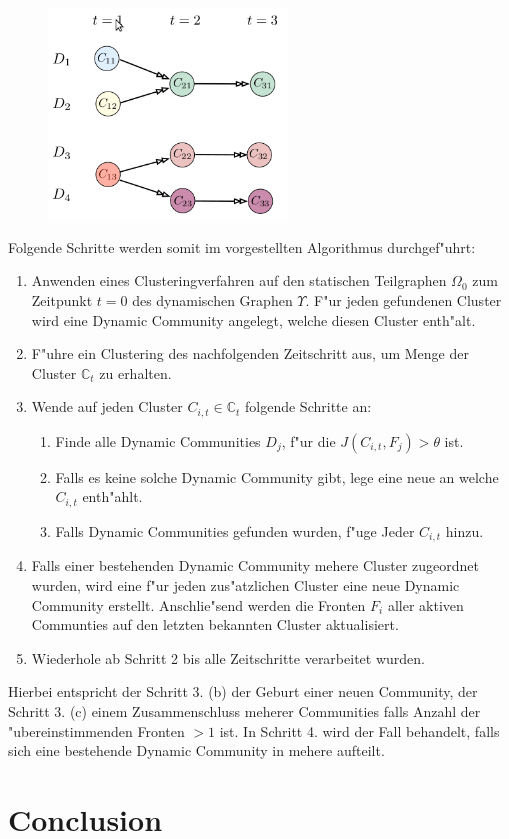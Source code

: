 \documentclass[journal]{vgtc}
\begin{document}
    \begin{figure}[b]
      \centering
      \includegraphics[width=2.5in]{images/dynamic_communities2}
      \caption{\label{fig:dynamic2} \cite{timestep}}
    \end{figure}
    Folgende Schritte werden somit im \cite{timestep} vorgestellten Algorithmus durchgef"uhrt:
    \begin{enumerate}
      \item Anwenden eines Clusteringverfahren auf den statischen Teilgraphen $\Omega_0$ zum Zeitpunkt $t=0$ des dynamischen Graphen $\Upsilon$. F"ur jeden gefundenen
	    Cluster wird eine Dynamic Community angelegt, welche diesen Cluster enth"alt.
      \item F"uhre ein Clustering des nachfolgenden Zeitschritt aus, um Menge der Cluster $\mathbb{C}_t$ zu erhalten.
      \item Wende auf jeden Cluster $C_{i,t} \in \mathbb{C}_t$ folgende Schritte an:
      \begin{enumerate}
	\item Finde alle Dynamic Communities $D_j$, f"ur die $J(C_{i,t},F_j) > \theta$ ist.
	\item Falls es keine solche Dynamic Community gibt, lege eine neue an welche $C_{i,t}$ enth"ahlt.
	\item Falls Dynamic Communities gefunden wurden, f"uge Jeder $C_{i,t}$ hinzu.
      \end{enumerate}
      \item Falls einer bestehenden Dynamic Community mehere Cluster zugeordnet wurden, wird eine f"ur jeden zus"atzlichen Cluster eine neue Dynamic Community erstellt.
	    Anschlie"send werden die Fronten $F_i$ aller aktiven Communties auf den letzten bekannten Cluster aktualisiert.
      \item Wiederhole ab Schritt 2 bis alle Zeitschritte verarbeitet wurden.
    \end{enumerate}
    Hierbei entspricht der Schritt 3. (b) der Geburt einer neuen Community, der Schritt 3. (c) einem Zusammenschluss meherer Communities falls Anzahl der "ubereinstimmenden
    Fronten $>1$ ist. In Schritt 4. wird der Fall behandelt, falls sich eine bestehende Dynamic Community in mehere aufteilt.



    
\section{Conclusion}



\end{document}
